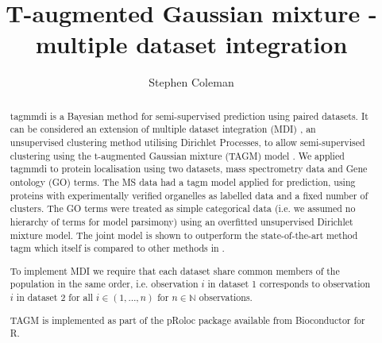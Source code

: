 \documentclass[11pt]{article} %
\title{T-augmented Gaussian mixture - multiple dataset integration}
\author{Stephen Coleman}
\providecommand{\keywords}[1]
{
  \small	
  \textbf{\textit{Keywords---}} #1
}
\begin{document}
 \pgfplotsset{compat=1.16}
\maketitle

\begin{abstract}
tagmmdi is a Bayesian method for semi-supervised prediction using paired datasets. It can be considered an extension of multiple dataset integration (MDI) \cite{kirkBayesianCorrelatedClustering2012}, an unsupervised clustering method utilising Dirichlet Processes, to allow semi-supervised clustering using the t-augmented Gaussian mixture (TAGM) model \cite{CrookBayesianMixtureModelling2018a}. We applied tagmmdi to protein localisation using two datasets, mass spectrometry data and Gene ontology (GO) terms. The MS data had a tagm model applied for prediction, using proteins with experimentally verified organelles as labelled data and a fixed number of clusters. The GO terms were treated as simple categorical data (i.e. we assumed no hierarchy of terms for model parsimony) using an overfitted unsupervised Dirichlet mixture model. The joint model is shown to outperform the state-of-the-art method tagm which itself is compared to other methods in \citet{CrookBayesianMixtureModelling2018a}.

To implement MDI we require that each dataset share common members of the population in the same order, i.e. observation $i$ in dataset 1 corresponds to observation $i$ in dataset 2 for all $i \in (1, \ldots, n)$ for $n \in \mathbb{N}$ observations.

TAGM is implemented as part of the pRoloc package available from Bioconductor for R.

\end{abstract}

\maketitle

\end{document}
